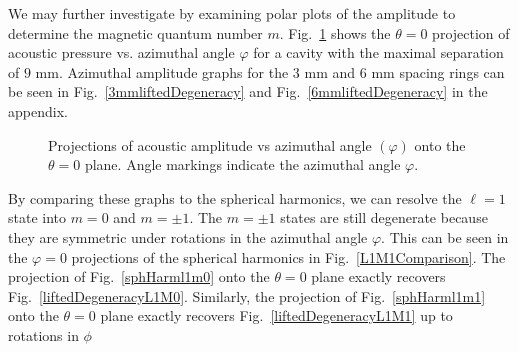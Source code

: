 \documentclass[12pt]{article}
\newcommand{\figref}[1]{Fig.\ \ref{#1}}
\begin{document}
	We may further investigate by examining polar plots of the amplitude to determine the magnetic quantum number $m$. \figref{9mmPolarliftedDegeneracy} shows the $\theta = 0$ projection of acoustic pressure vs. azimuthal angle $\varphi$ for a cavity with the maximal separation of $9$ mm. Azimuthal amplitude graphs for the $3$ mm and $6$ mm spacing rings can be seen in \figref{3mmliftedDegeneracy} and \figref{6mmliftedDegeneracy} in the appendix.
	
	\begin{figure}[H]
		\centering
		\qquad
		\caption{Projections of acoustic amplitude vs azimuthal angle $(\varphi)$ onto the $\theta=0$ plane. Angle markings indicate the azimuthal angle $\varphi$.}
		\label{9mmPolarliftedDegeneracy}		
	\end{figure}

	By comparing these graphs to the spherical harmonics, we can resolve the $\ell=1$ state into $m=0$ and $m=\pm1$. 
	The $m=\pm1$ states are still degenerate because they are symmetric under rotations in the azimuthal angle $\varphi$. This can be seen in the $\varphi=0$ projections of the spherical harmonics in \figref{L1M1Comparison}. The projection of \figref{sphHarml1m0} onto the $\theta = 0$ plane exactly recovers \figref{liftedDegeneracyL1M0}. Similarly, the projection of \figref{sphHarml1m1} onto the $\theta = 0$ plane exactly recovers \figref{liftedDegeneracyL1M1} up to rotations in $\phi$
\end{document}
